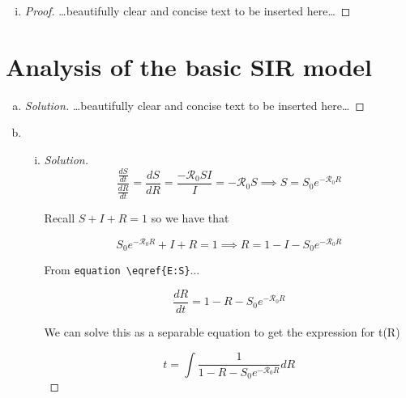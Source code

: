 \documentclass[12pt]{article}
\begin{document}
\begin{enumerate}[(a)]
\begin{enumerate}[(i)]
  \item \SIanalQbii
    
    {\color{blue}
      \begin{proof}
        {\color{magenta}\dots beautifully clear and concise text to be inserted here\dots}
      \end{proof}
    }
    
  \end{enumerate}
\end{enumerate}

\section{Analysis of the basic SIR  model}

\basicSIRanalIntro
\begin{enumerate}[(a)]
\item \basicSIRanalQa

{\color{blue}
\begin{proof}[Solution]
{\color{magenta}\dots beautifully clear and concise text to be inserted here\dots}
\end{proof}
}

\item \basicSIRanalQb
  \begin{enumerate}[(i)]
  \item \basicSIRanalQbi

{\color{blue}
\begin{proof}[Solution]

	\begin{equation}
	\frac{\frac{dS}{dt}}{\frac{dR}{dt}} = \frac{dS}{dR} = \frac{-\mathcal{R}_0SI}{I} = -\mathcal{R}_0S \implies S=S_0e^{-\mathcal{R}_0R}
	\end{equation}
	
	Recall $S+I+R=1$ so we have that
	
	\begin{equation}
	S_0e^{-\mathcal{R}_0R}+I+R = 1 \implies R=1-I-S_0e^{-\mathcal{R}_0R}
	\end{equation}
	
	From \verb|equation \eqref{E:S}|...
	
	\begin{equation}
	\frac{dR}{dt}=1-R-S_0e^{-\mathcal{R}_0R}
	\end{equation}
	
	We can solve this as a separable equation to  get the expression for t(R)
	
	\begin{equation}
	t=\int \frac{1}{1-R-S_0e^{-\mathcal{R}_0R}}dR
	\end{equation}
	

\end{proof}}
\end{enumerate}
\end{enumerate}
\end{document}
